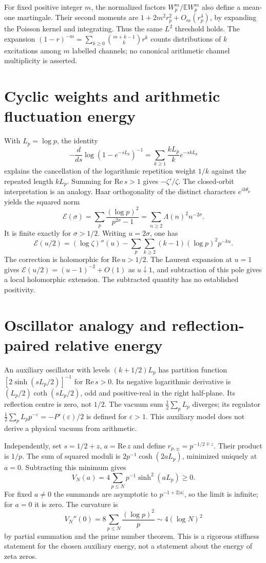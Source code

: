 \documentclass[11pt,a4paper]{article}
\theoremstyle{definition}\newtheorem{definition}[proposition]{Definition}
\theoremstyle{remark}\newtheorem{remark}[proposition]{Remark}
\begin{document}
For fixed positive integer $m$, the normalized factors $W_p^m/\mathbb E W_p^m$ also define a mean-one martingale. Their second moments are $1+2m^2r_p^2+O_m(r_p^4)$, by expanding the Poisson kernel and integrating. Thus the same $L^2$ threshold holds. The expansion $(1-r)^{-m}=\sum_{k\ge0}\binom{m+k-1}{k}r^k$ counts distributions of $k$ excitations among $m$ labelled channels; no canonical arithmetic channel multiplicity is asserted.

\section{Cyclic weights and arithmetic fluctuation energy}
With $L_p=\log p$, the identity
\[
-\frac{d}{ds}\log(1-e^{-sL_p})^{-1}
=\sum_{k\ge1}\frac{kL_p}{k}e^{-skL_p}
\]
explains the cancellation of the logarithmic repetition weight $1/k$ against the repeated length $kL_p$. Summing for $\mathrm{Re}\,s>1$ gives $-\zeta'/\zeta$. The closed-orbit interpretation is an analogy.
Haar orthogonality of the distinct characters $e^{ik\theta_p}$ yields the squared norm
\[
\mathcal E(\sigma)=\sum_p\frac{(\log p)^2}{p^{2\sigma}-1}
=\sum_{n\ge2}\Lambda(n)^2n^{-2\sigma}.
\]
It is finite exactly for $\sigma>1/2$. Writing $u=2\sigma$, one has
\[
\mathcal E(u/2)=(\log\zeta)''(u)
-\sum_p\sum_{k\ge2}(k-1)(\log p)^2p^{-ku}.
\]
The correction is holomorphic for $\mathrm{Re}\,u>1/2$. The Laurent expansion at $u=1$ gives $\mathcal E(u/2)=(u-1)^{-2}+O(1)$ as $u\downarrow1$, and subtraction of this pole gives a local holomorphic extension. The subtracted quantity has no established positivity.

\section{Oscillator analogy and reflection-paired relative energy}
An auxiliary oscillator with levels $(k+1/2)L_p$ has partition function $[2\sinh(sL_p/2)]^{-1}$ for $\mathrm{Re}\,s>0$. Its negative logarithmic derivative is $(L_p/2)\coth(sL_p/2)$, odd and positive-real in the right half-plane. Its reflection centre is zero, not $1/2$. The vacuum sum $\tfrac12\sum_p L_p$ diverges; its regulator $\tfrac12\sum_p L_pp^{-\varepsilon}=-P'(\varepsilon)/2$ is defined for $\varepsilon>1$. This auxiliary model does not derive a physical vacuum from arithmetic.

Independently, set $s=1/2+z$, $a=\mathrm{Re}\,z$ and define $r_{p,\pm}=p^{-1/2\mp z}$. Their product is $1/p$. The sum of squared moduli is $2p^{-1}\cosh(2aL_p)$, minimized uniquely at $a=0$. Subtracting this minimum gives
\[
V_N(a)=4\sum_{p\le N}p^{-1}\sinh^2(aL_p)\ge0.
\]
For fixed $a\ne0$ the summands are asymptotic to $p^{-1+2|a|}$, so the limit is infinite; for $a=0$ it is zero. The curvature is
\[
V_N''(0)=8\sum_{p\le N}\frac{(\log p)^2}{p}
\sim4(\log N)^2
\]
by partial summation and the prime number theorem. This is a rigorous stiffness statement for the chosen auxiliary energy, not a statement about the energy of zeta zeros.
\end{document}
